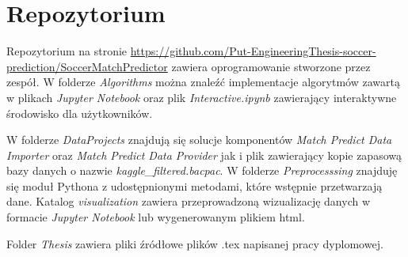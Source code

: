 \documentclass[polish,bachelor,a4paper,oneside]{ppfcmthesis}
\begin{document}
\chapter{Repozytorium}
\noindent Repozytorium na stronie \url{https://github.com/Put-EngineeringThesis-soccer-prediction/SoccerMatchPredictor} zawiera oprogramowanie stworzone przez zespół. W folderze \textit{Algorithms} można znaleźć implementacje algorytmów zawartą w plikach \textit{Jupyter Notebook} oraz plik \textit{Interactive.ipynb} zawierający interaktywne środowisko dla użytkowników.

W folderze \textit{DataProjects} znajdują się solucje komponentów  \textit{Match Predict Data Importer} oraz \textit{Match Predict Data Provider} jak i plik zawierający kopie zapasową bazy danych o nazwie \textit{kaggle\_filtered.bacpac}. W folderze \textit{Preprocesssing} znajduję się moduł Pythona z udostępnionymi metodami, które wstępnie przetwarzają dane. Katalog \textit{visualization} zawiera przeprowadzoną wizualizację danych w formacie \textit{Jupyter Notebook} lub wygenerowanym plikiem html.

Folder \textit{Thesis} zawiera pliki źródłowe plików .tex napisanej pracy dyplomowej.
\newpage\null\thispagestyle{empty}\newpage

\ppcolophon
\end{document}
